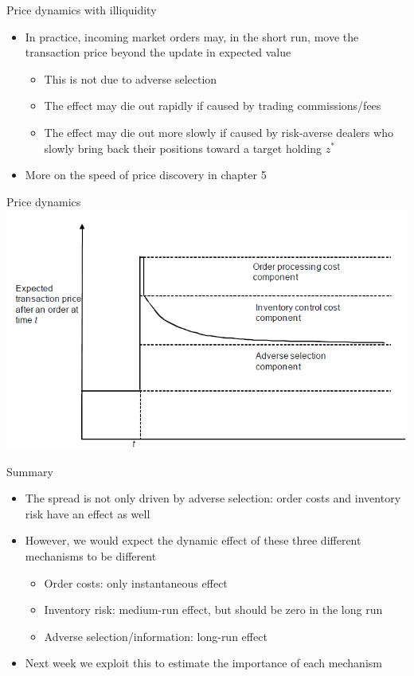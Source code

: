 \documentclass[english,10pt]{beamer}
\begin{document}
\begin{frame}{Price dynamics with illiquidity}
	\begin{itemize}
		\item In practice, incoming market orders may, in the short run, move the transaction price beyond the update in expected value
		\begin{itemize}
			\item This is not due to adverse selection
			\item The effect may die out rapidly if caused by trading commissions/fees
			\item The effect may die out more slowly if caused by risk-averse dealers who slowly bring back their positions toward a target holding $z^*$
		\end{itemize}
		\item More on the speed of price discovery in chapter 5
	\end{itemize}
\end{frame}


\begin{frame}{Price dynamics}
	\includegraphics[width=0.9\linewidth]{pics/PriceDiscovery_Image}
\end{frame}


\begin{frame}{Summary}
	\begin{itemize}
		\item The spread is not only driven by adverse selection: order costs and inventory risk have an effect as well
		\item However, we would expect the dynamic effect of these three different mechanisms to be different
		\begin{itemize}
			\item Order costs: only instantaneous effect 
			\item Inventory risk: medium-run effect, but should be zero in the long run
			\item Adverse selection/information: long-run effect 
		\end{itemize}
		\item Next week we exploit this to estimate the importance of each mechanism
	\end{itemize}
\end{frame}
\end{document}
